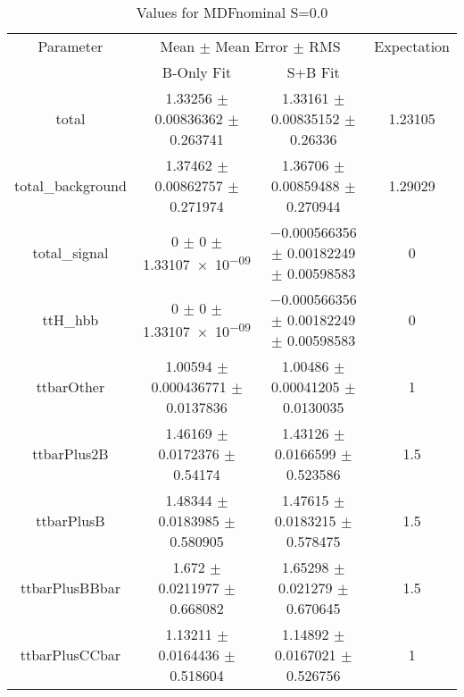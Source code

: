 \begin{table}
\centering
\caption{Values for MDFnominal S=0.0}
\begin{tabular}{cccc}
\toprule
Parameter & \multicolumn{2}{c}{Mean $\pm$ Mean Error $\pm$ RMS} & Expectation\\
 & B-Only Fit & S+B Fit & \\
\midrule
total & \num{1.33256} $\pm$ \num{0.00836362} $\pm$ \num{0.263741} & \num{1.33161} $\pm$ \num{0.00835152} $\pm$ \num{0.26336} & \num{1.23105}\\
total\_background & \num{1.37462} $\pm$ \num{0.00862757} $\pm$ \num{0.271974} & \num{1.36706} $\pm$ \num{0.00859488} $\pm$ \num{0.270944} & \num{1.29029}\\
total\_signal & \num{0} $\pm$ \num{0} $\pm$ \num{1.33107e-09} & \num{-0.000566356} $\pm$ \num{0.00182249} $\pm$ \num{0.00598583} & \num{0}\\
ttH\_hbb & \num{0} $\pm$ \num{0} $\pm$ \num{1.33107e-09} & \num{-0.000566356} $\pm$ \num{0.00182249} $\pm$ \num{0.00598583} & \num{0}\\
ttbarOther & \num{1.00594} $\pm$ \num{0.000436771} $\pm$ \num{0.0137836} & \num{1.00486} $\pm$ \num{0.00041205} $\pm$ \num{0.0130035} & \num{1}\\
ttbarPlus2B & \num{1.46169} $\pm$ \num{0.0172376} $\pm$ \num{0.54174} & \num{1.43126} $\pm$ \num{0.0166599} $\pm$ \num{0.523586} & \num{1.5}\\
ttbarPlusB & \num{1.48344} $\pm$ \num{0.0183985} $\pm$ \num{0.580905} & \num{1.47615} $\pm$ \num{0.0183215} $\pm$ \num{0.578475} & \num{1.5}\\
ttbarPlusBBbar & \num{1.672} $\pm$ \num{0.0211977} $\pm$ \num{0.668082} & \num{1.65298} $\pm$ \num{0.021279} $\pm$ \num{0.670645} & \num{1.5}\\
ttbarPlusCCbar & \num{1.13211} $\pm$ \num{0.0164436} $\pm$ \num{0.518604} & \num{1.14892} $\pm$ \num{0.0167021} $\pm$ \num{0.526756} & \num{1}\\
\bottomrule
\end{tabular}
\end{table}